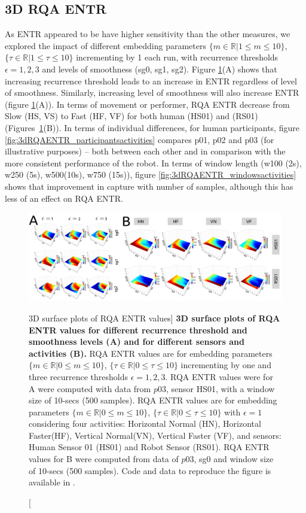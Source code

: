 \documentclass[fleqn,10pt]{wlscirep}
\begin{document}
\subsection*{3D RQA ENTR}
As ENTR appeared to be have higher sensitivity than the other measures, we explored the impact of different embedding parameters $ \{ m \in \mathbb{R} | 1 \le m \le 10  \} $, $  \{ \tau \in \mathbb{R} | 1 \le \tau \le 10  \} $ incrementing by 1 each run, with recurrence thresholds $\epsilon=1, 2, 3$ and levels of smoothness (sg0, sg1, sg2).
Figure \ref{fig06}(A) shows that increasing recurrence threshold leads to an increase in ENTR regardless of level of smoothness.
Similarly, increasing level of smoothness will also increase ENTR (figure \ref{fig06}(A)).
In terms of movement or performer, RQA ENTR decrease from Slow (HS, VS) to Fast (HF, VF) for both human (HS01) and (RS01) (Figures~\ref{fig06}(B)).
In terms of individual differences, for human participants, figure \ref{fig:3dRQAENTR_participantsactivities} compares p01, p02 and p03 (for illustrative purposes) -- both between each other and in comparison with the more consistent performance of the robot.
In terms of window length (w100 (2s), w250 (5s), w500(10s), w750 (15s)), figure \ref{fig:3dRQAENTR_windowsactivities} shows that improvement in capture with number of samples, although this has less of an effect on RQA ENTR.

\begin{figure}
\centering
\includegraphics[width=1.0\textwidth]{figures/fig06/versions/drawing-v00}
    \caption
	[3D surface plots of RQA ENTR values]{
	{\bf 
	3D surface plots of RQA ENTR values for different recurrence threshold and smoothness levels (A) and for different sensors and activities (B).}
	RQA ENTR values are for embedding parameters $ \{ m \in \mathbb{R} | 0 \le m \le 10  \} $, $ \{ \tau \in \mathbb{R} | 0 \le \tau \le 10  \}$ incrementing by one and three recurrence thresholds $\epsilon=1, 2, 3$.
	RQA ENTR values were for A were computed with data from $p03$, sensor HS01, with a window size of 10-secs (500 samples).
	RQA ENTR values are for embedding parameters $ \{ m \in \mathbb{R} | 0 \le m \le 10  \}$, $ \{ \tau \in \mathbb{R} | 0 \le \tau \le 10  \}$ with $\epsilon = 1 $ considering four activities: Horizontal Normal (HN), Horizontal Faster(HF), Vertical Normal(VN), Vertical Faster (VF), and sensors: Human Sensor 01 (HS01) and Robot Sensor (RS01).
	RQA ENTR values for B were computed from data of $p03$, sg0 and window size of 10-secs (500 samples).
	Code and data to reproduce the figure is available in \cite{srep2021}.
        }
    \label{fig06}
\end{figure}
\end{document}
